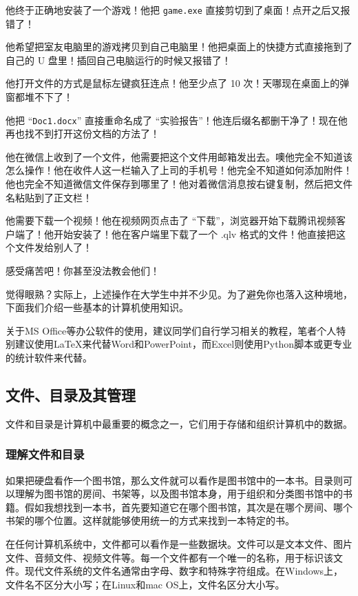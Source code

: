 他终于正确地安装了一个游戏！他把 \texttt{game.exe} 直接剪切到了桌面！点开之后又报错了！

他希望把室友电脑里的游戏拷贝到自己电脑里！他把桌面上的快捷方式直接拖到了自己的 U 盘里！插回自己电脑运行的时候又报错了！

他打开文件的方式是鼠标左键疯狂连点！他至少点了 10 次！天哪现在桌面上的弹窗都堆不下了！

他把 “\texttt{Doc1.docx}” 直接重命名成了 “实验报告”！他连后缀名都删干净了！现在他再也找不到打开这份文档的方法了！

他在微信上收到了一个文件，他需要把这个文件用邮箱发出去。噢他完全不知道该怎么操作！他在收件人这一栏输入了上司的手机号！他完全不知道如何添加附件！他也完全不知道微信文件保存到哪里了！他对着微信消息按右键复制，然后把文件名粘贴到了正文栏！

他需要下载一个视频！他在视频网页点击了 “下载”，浏览器开始下载腾讯视频客户端了！他开始安装了！他在客户端里下载了一个 .qlv 格式的文件！他直接把这个文件发给别人了！

感受痛苦吧！你甚至没法教会他们！

觉得眼熟？实际上，上述操作在大学生中并不少见。为了避免你也落入这种境地，下面我们介绍一些基本的计算机使用知识。

关于MS Office等办公软件的使用，建议同学们自行学习相关的教程，笔者个人特别建议使用LaTeX来代替Word和PowerPoint，而Excel则使用Python脚本或更专业的统计软件来代替。

\subsection{文件、目录及其管理}

文件和目录是计算机中最重要的概念之一，它们用于存储和组织计算机中的数据。

\subsubsection{理解文件和目录}

如果把硬盘看作一个图书馆，那么文件就可以看作是图书馆中的一本书。目录则可以理解为图书馆的房间、书架等，以及图书馆本身，用于组织和分类图书馆中的书籍。假如我想找到一本书，首先要知道它在哪个图书馆，其次是在哪个房间、哪个书架的哪个位置。这样就能够使用统一的方式来找到一本特定的书。

在任何计算机系统中，文件都可以看作是一些数据块。文件可以是文本文件、图片文件、音频文件、视频文件等。每一个文件都有一个唯一的名称，用于标识该文件。现代文件系统的文件名通常由字母、数字和特殊字符组成。在Windows上，文件名不区分大小写；在Linux和mac OS上，文件名区分大小写。

